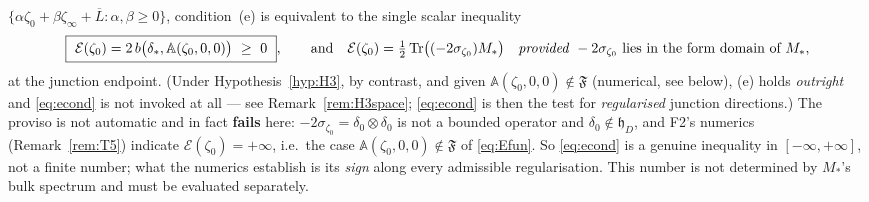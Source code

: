 \documentclass[11pt]{article}
\newcommand{\hh}{\mathfrak h}
\newcommand{\Aop}{\mathbb A}
\begin{document}
\begin{proposition}
\begin{enumerate}[leftmargin=1.6em,itemsep=1pt]
 $\{\alpha\zeta_0+\beta\zeta_\infty+\overline L:\alpha,\beta\ge0\}$, condition~(e) is
 equivalent to the single scalar inequality
 \begin{equation}\label{eq:econd}
  \boxed{\ \mathcal E(\zeta_0)=2\,b\bigl(\delta_*,\Aop(\zeta_0,0,0)\bigr)\ \ge\ 0\ },
  \qquad\text{and}\quad \mathcal E(\zeta_0)=\tfrac12\Tr\bigl((-2\sigma_{\zeta_0})M_*\bigr)
  \quad\text{\emph{provided} }-2\sigma_{\zeta_0}\ \text{lies in the form domain of }M_* ,
 \end{equation}
 at the junction endpoint.  (Under Hypothesis~\ref{hyp:H3}, by contrast, and given $\Aop(\zeta_0,0,0)\notin\mathfrak F$ (numerical, see below), (e) holds
 \emph{outright} and \eqref{eq:econd} is not invoked at all --- see
 Remark~\ref{rem:H3space}; \eqref{eq:econd} is then the test for \emph{regularised}
 junction directions.)  The proviso is not automatic and in fact
 \textbf{fails} here: $-2\sigma_{\zeta_0}=\delta_0\otimes\delta_0$ is not a bounded
 operator and $\delta_0\notin\hh_D$, and F2's numerics (Remark~\ref{rem:T5}) indicate
 $\mathcal E(\zeta_0)=+\infty$, i.e.\ the case $\Aop(\zeta_0,0,0)\notin\mathfrak F$ of
 \eqref{eq:Efun}.  So \eqref{eq:econd} is a genuine inequality in $[-\infty,+\infty]$, not
 a finite number; what the numerics establish is its \emph{sign} along every admissible
 regularisation.  This number is not determined by $M_*$'s bulk spectrum and must
 be evaluated separately.
\end{enumerate}
\end{proposition}
\end{document}
